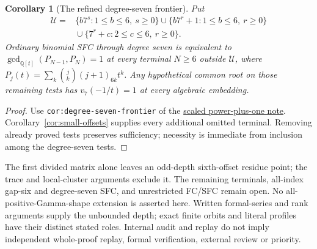 \documentclass[11pt]{article}
\newtheorem{corollary}[theorem]{Corollary}
\begin{document}
\begin{corollary}[The refined degree-seven frontier]
\label{cor:degree-seven-frontier}
Put
\[
\begin{split}
 \mathcal U={}&\{b7^s:1\le b\le6,\ s\ge0\}
 \cup\{b7^r+1:1\le b\le6,\ r\ge0\}\\
 &{}\cup\{7^r+c:2\le c\le6,\ r\ge0\}.
\end{split}
\]
Ordinary binomial SFC through degree seven is equivalent to
$\gcd_{\mathbb Q[t]}(P_{N-1},P_N)=1$ at every terminal $N\ge6$
outside $\mathcal U$, where
$P_j(t)=\sum_k\binom jk(j+1)_{6k}t^k$.
Any hypothetical common root on those remaining tests has
$v_7(-1/t)=1$ at every algebraic embedding.
\end{corollary}
\begin{proof}
Use \texttt{cor:degree-seven-frontier} of the
\href{GAP_SIX_SCALED_POWER_PLUS_ONE_SFC.tex}{scaled power-plus-one note}.
Corollary~\ref{cor:small-offsets} supplies every additional omitted
terminal. Removing already proved tests preserves sufficiency;
necessity is immediate from inclusion among the degree-seven tests.
\end{proof}
The first divided matrix alone leaves an odd-depth sixth-offset
residue point; the trace and local-cluster arguments exclude it.
The remaining terminals, all-index gap-six and degree-seven SFC,
and unrestricted FC/SFC remain open.
No all-positive-Gamma-shape extension is asserted here.
Written formal-series and rank arguments supply the unbounded depth;
exact finite orbits and literal profiles have their distinct stated roles.
Internal audit and replay do not imply independent whole-proof replay,
formal verification, external review or priority.
\end{document}
